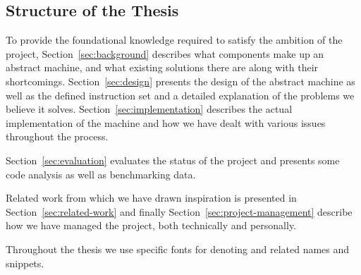 \subsection{Structure of the Thesis}

To provide the foundational knowledge required to satisfy the ambition of the
project, Section~\ref{sec:background} describes what components make up an
abstract machine, and what existing solutions there are along with their
shortcomings. Section~\ref{sec:design} presents the design of the abstract
machine as well as the defined instruction set and a detailed explanation of the
problems we believe it solves. Section~\ref{sec:implementation} describes the
actual implementation of the machine and how we have dealt with various issues
throughout the process.

Section~\ref{sec:evaluation} evaluates the status of the project and presents
some code analysis as well as benchmarking data.

Related work from which we have drawn inspiration is presented in
Section~\ref{sec:related-work} and finally Section~\ref{sec:project-management}
describe how we have managed the project, both technically and personally.

Throughout the thesis we use specific fonts for denoting  and
 related names and snippets.
